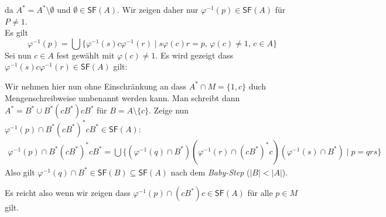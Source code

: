 \documentclass[12pt, german]{article}
\newcommand{\inv}{^{-1}}
\newcommand{\starfree}{\mathsf{SF}}
\newcommand{\aast}{A^{\ast}}
\newcommand{\bast}{B^{\ast}}
\begin{document}
	da $\aast = \aast \setminus \emptyset$ und $\emptyset \in \starfree(A)$. Wir zeigen daher nur $\varphi\inv(p) \in \starfree(A)$ für $P \not = 1$.  \\
	
	Es gilt $$\varphi\inv(p) = \bigcup \{\varphi\inv (s) c \varphi\inv(r) \mid s\varphi(c)r = p, \, \varphi(c) \not = 1, \, c \in A\}$$
	Sei nun $c\in A$ fest gewählt mit $\varphi(c) \not = 1$. Es wird gezeigt dass $\varphi\inv(s)c\varphi\inv(r) \in \starfree(A)$ gilt: 
	\newline
	
	Wir nehmen hier nun ohne Einschränkung an dass $\aast \cap M = \{1, c\}$ duch Mengenschreibweise umbenannt werden kann. 
	Man schreibt dann $\aast = \bast \cup \bast (c \bast) c \bast$ für $B = A \setminus \{c\}$. Zeige nun $\varphi\inv(p) \cap \bast(c\bast)^\ast c\bast \in \starfree(A)$: 
	\begin{align*}
		\varphi\inv(p) \cap \bast(c\bast)^\ast c\bast = \bigcup \{(\varphi\inv(q) \cap \bast)(\varphi\inv(r)\cap(c\bast)^\ast c) (\varphi\inv(s) \cap \bast) \mid p = qrs\}
	\end{align*} 
	Also gilt $\varphi\inv(q) \cap \bast \in \starfree(B) \subseteq \starfree(A)$ nach dem \textit{Baby-Step} ($|B| < |A|$). 
	\newline
	
	Es reicht also wenn wir zeigen dass $\varphi\inv(p) \cap (c\bast)c \in \starfree(A)$ für alle $p \in M$ gilt. 
	
\end{document}
